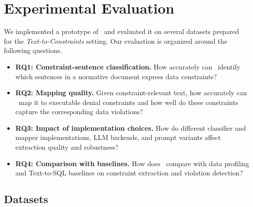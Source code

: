 


\section{Experimental Evaluation}
\label{sec:experiments}

We implemented a prototype of \system\ and evaluated it on several datasets prepared for the \emph{Text-to-Constraints} setting. Our evaluation is organized around the following questions.
\begin{itemize}[leftmargin=0.5cm]
    \item \textbf{RQ1: Constraint-sentence classification.} How accurately can \system\ identify which sentences in a normative document express data constraints?

    \item \textbf{RQ2: Mapping quality.} Given constraint-relevant text, how accurately can \system\ map it to executable denial constraints and  how well do these constraints capture the corresponding data violations?

    \item \textbf{RQ3: Impact of implementation choices.} How do different classifier and mapper implementations, LLM backends, and prompt variants affect extraction quality and robustness?

    \item \textbf{RQ4: Comparison with baselines.} How does \system\ compare with data profiling and Text-to-SQL baselines on constraint extraction and violation detection?
\end{itemize}

\subsection{Datasets}
\label{sec:datasets}



